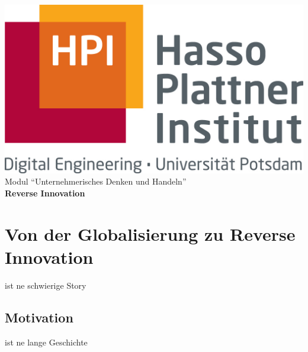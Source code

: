 \documentclass[a4paper,11pt]{scrartcl}
\author{Simon  Stadlinger}
\begin{document}
	\begin{titlepage}
		\centering
		\includegraphics[scale=.6]{hpi_logo.jpg}\\\vspace{2cm}
		{\LARGE Modul "`Unternehmerisches Denken und Handeln"'}\\\vspace{.4cm}
		{\Huge \textbf{Reverse Innovation}}\\\vspace{2cm}
		
	\end{titlepage}
\newpage
\thispagestyle{empty}
\section*{}
\newpage
\pagestyle{fancy}
\tableofcontents\newpage
\section{Von der Globalisierung zu Reverse Innovation}
ist ne schwierige Story
\subsection{Motivation}
ist ne lange Geschichte
\end{document}
